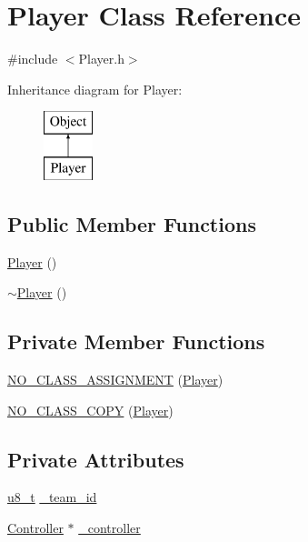 \section{Player Class Reference}
\label{class_player}


{\ttfamily \#include $<$Player.\-h$>$}

Inheritance diagram for Player\-:\begin{figure}[H]
\begin{center}
\leavevmode
\includegraphics[height=2.000000cm]{class_player}
\end{center}
\end{figure}
\subsection*{Public Member Functions}
\begin{DoxyCompactItemize}
\item 
\hyperlink{class_player_affe0cc3cb714f6deb4e62f0c0d3f1fd8}{Player} ()
\item 
\hyperlink{class_player_a749d2c00e1fe0f5c2746f7505a58c062}{$\sim$\-Player} ()
\end{DoxyCompactItemize}
\subsection*{Private Member Functions}
\begin{DoxyCompactItemize}
\item 
\hyperlink{class_player_add4c64bc1590130ff05550a84ecf1877}{N\-O\-\_\-\-C\-L\-A\-S\-S\-\_\-\-A\-S\-S\-I\-G\-N\-M\-E\-N\-T} (\hyperlink{class_player}{Player})
\item 
\hyperlink{class_player_a307a3c404352191cde03acb2b00901c8}{N\-O\-\_\-\-C\-L\-A\-S\-S\-\_\-\-C\-O\-P\-Y} (\hyperlink{class_player}{Player})
\end{DoxyCompactItemize}
\subsection*{Private Attributes}
\begin{DoxyCompactItemize}
\item 
\hyperlink{types_8h_ae081489b4906f65a3cb18e9fbe9f8d23}{u8\-\_\-t} \hyperlink{class_player_aaef4b1a3c232301ddb8795f8961d2ddb}{\-\_\-team\-\_\-id}
\item 
\hyperlink{class_controller}{Controller} $\ast$ \hyperlink{class_player_a558ec26b3634846a636738aa78541d20}{\-\_\-controller}
\end{DoxyCompactItemize}


